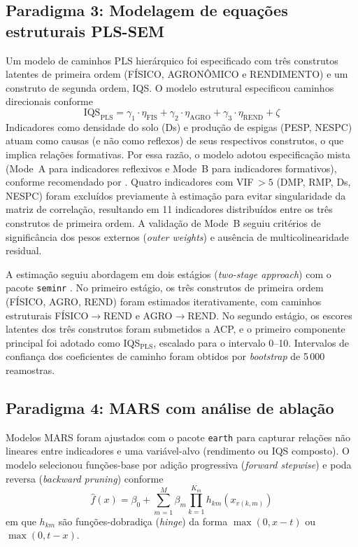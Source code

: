 \documentclass[pdflatex,sn-basic]{sn-jnl}%
\begin{document}
\subsection{Paradigma 3: Modelagem de equações estruturais PLS-SEM}\label{subsec:sem}

Um modelo de caminhos PLS hierárquico foi especificado com três construtos latentes de primeira ordem (FÍSICO, AGRONÔMICO e RENDIMENTO) e um construto de segunda ordem, IQS. O modelo estrutural especificou caminhos direcionais conforme
\begin{equation}
\text{IQS}_{\text{PLS}} = \gamma_1 \cdot \eta_{\text{FIS}} + \gamma_2 \cdot \eta_{\text{AGRO}} + \gamma_3 \cdot \eta_{\text{REND}} + \zeta
\label{eq:plssem}
\end{equation}
Indicadores como densidade do solo (Ds) e produção de espigas (PESP, NESPC) atuam como causas (e não como reflexos) de seus respectivos construtos, o que implica relações formativas. Por essa razão, o modelo adotou especificação mista (Mode~A para indicadores reflexivos e Mode~B para indicadores formativos), conforme recomendado por \cite{Hair2019}. Quatro indicadores com VIF\,$> 5$ (DMP, RMP, Ds, NESPC) foram excluídos previamente à estimação para evitar singularidade da matriz de correlação, resultando em 11 indicadores distribuídos entre os três construtos de primeira ordem. A validação de Mode~B seguiu critérios de significância dos pesos externos (\textit{outer weights}) e ausência de multicolinearidade residual.

A estimação seguiu abordagem em dois estágios (\textit{two-stage approach}) com o pacote \texttt{seminr} \cite{Ray2022}. No primeiro estágio, os três construtos de primeira ordem (FÍSICO, AGRO, REND) foram estimados iterativamente, com caminhos estruturais FÍSICO$\to$REND e AGRO$\to$REND. No segundo estágio, os escores latentes dos três construtos foram submetidos a ACP, e o primeiro componente principal foi adotado como IQS$_{\text{PLS}}$, escalado para o intervalo 0--10. Intervalos de confiança dos coeficientes de caminho foram obtidos por \textit{bootstrap} de 5\,000 reamostras.

\subsection{Paradigma 4: MARS com análise de ablação}\label{subsec:mars}

Modelos MARS foram ajustados com o pacote \texttt{earth} \cite{Milborrow2023} para capturar relações não lineares entre indicadores e uma variável-alvo (rendimento ou IQS composto). O modelo selecionou funções-base por adição progressiva (\textit{forward stepwise}) e poda reversa (\textit{backward pruning}) conforme
\begin{equation}
\hat{f}(x) = \beta_0 + \sum_{m=1}^{M} \beta_m \prod_{k=1}^{K_m} h_{km}(x_{v(k,m)})
\label{eq:mars}
\end{equation}
em que $h_{km}$ são funções-dobradiça (\textit{hinge}) da forma $\max(0, x - t)$ ou $\max(0, t - x)$.
\end{document}
